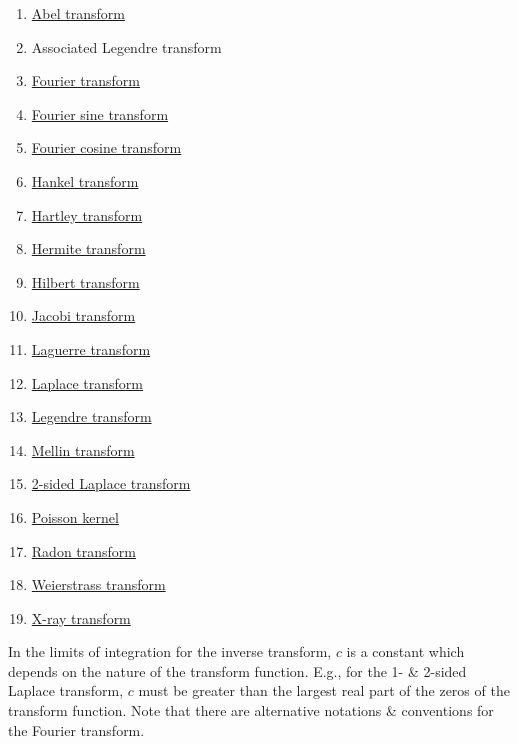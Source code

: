 \documentclass{article}
\begin{document}
\begin{enumerate}
	\item \href{https://en.wikipedia.org/wiki/Abel_transform}{Abel transform}
	\item Associated Legendre transform 
	\item \href{https://en.wikipedia.org/wiki/Fourier_transform}{Fourier transform}
	\item \href{https://en.wikipedia.org/wiki/Fourier_sine_transform}{Fourier sine transform}
	\item \href{https://en.wikipedia.org/wiki/Fourier_cosine_transform}{Fourier cosine transform}
	\item \href{https://en.wikipedia.org/wiki/Hankel_transform}{Hankel transform}
	\item \href{https://en.wikipedia.org/wiki/Hartley_transform}{Hartley transform}
	\item \href{https://en.wikipedia.org/wiki/Hermite_transform}{Hermite transform}
	\item \href{https://en.wikipedia.org/wiki/Hilbert_transform}{Hilbert transform}
	\item \href{https://en.wikipedia.org/wiki/Jacobi_transform}{Jacobi transform}
	\item \href{https://en.wikipedia.org/wiki/Laguerre_transform}{Laguerre transform}
	\item \href{https://en.wikipedia.org/wiki/Laplace_transform}{Laplace transform}
	\item \href{https://en.wikipedia.org/wiki/Legendre_transform_(integral_transform)}{Legendre transform}
	\item \href{https://en.wikipedia.org/wiki/Mellin_transform}{Mellin transform}
	\item \href{https://en.wikipedia.org/wiki/Two-sided_Laplace_transform}{2-sided Laplace transform}
	\item \href{https://en.wikipedia.org/wiki/Poisson_kernel}{Poisson kernel}
	\item \href{https://en.wikipedia.org/wiki/Radon_transform}{Radon transform}
	\item \href{https://en.wikipedia.org/wiki/Weierstrass_transform}{Weierstrass transform}
	\item \href{https://en.wikipedia.org/wiki/X-ray_transform}{X-ray transform}
\end{enumerate}
In the limits of integration for the inverse transform, $c$ is a constant which depends on the nature of the transform function. E.g., for the 1- \& 2-sided Laplace transform, $c$ must be greater than the largest real part of the zeros of the transform function. Note that there are alternative notations \& conventions for the Fourier transform.
\end{document}
